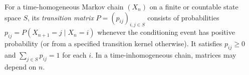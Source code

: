 
For a time-homogeneous Markov chain $(X_n)$ on a finite or countable state space $S$, its \emph{transition matrix} $P=(p_{ij})_{i,j\in S}$ consists of probabilities $p_{ij}=P(X_{n+1}=j\mid X_n=i)$ whenever the conditioning event has positive probability (or from a specified transition kernel otherwise). It satisfies $p_{ij}\ge0$ and $\sum_{j\in S}p_{ij}=1$ for each $i$. In a time-inhomogeneous chain, matrices may depend on $n$.
